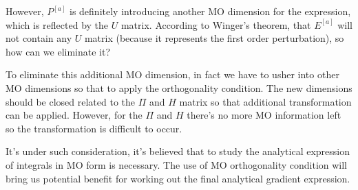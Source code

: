 However, $P^{[a]}$ is definitely introducing another MO dimension for the
expression, which is reflected by the $U$ matrix. According to Winger's
theorem, that $E^{[a]}$ will not contain any $U$ matrix (because it represents
the first order perturbation), so how can we eliminate it?

To eliminate this additional MO dimension, in fact we have to usher into other
MO dimensions so that to apply the orthogonality condition. The new dimensions
should be closed related to the $\Pi$ and $H$ matrix so that additional
transformation can be applied. However, for the $\Pi$ and $H$ there's no more
MO information left so the transformation is difficult to occur.

It's under such consideration, it's believed that to study the analytical
expression of integrals in MO form is necessary. The use of MO
orthogonality condition will bring us potential benefit for working out the
final analytical gradient expression. 

